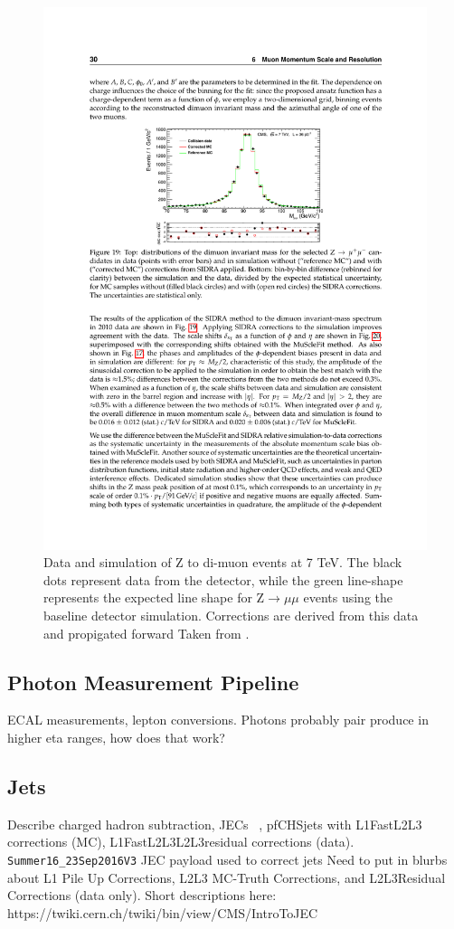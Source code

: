     \begin{figure}[h!]
      \centering
      \includegraphics[width=.7\textwidth]{figures/muon_Z_resolution.pdf}
      \caption{Data and simulation of Z to di-muon events at 7 TeV. The black dots represent data from the detector, while the green line-shape represents the expected line shape for Z$\to\mu\mu$ events using the baseline detector simulation. Corrections are derived from this data and propigated forward Taken from \cite{cms_muons}.}
      \label{fig:muon_Z_resolution}
    \end{figure}
    
  \subsection{Photon Measurement Pipeline}
    ECAL measurements, lepton conversions. Photons probably pair produce in higher eta ranges, how does that work?
  \subsection{Jets} \label{sec:jets}
    Describe charged hadron subtraction, JECs ~\cite{JERC}, \cite{JEC_2016}
    pfCHSjets with L1FastL2L3 corrections (MC), L1FastL2L3L2L3residual corrections (data).
    \verb=Summer16_23Sep2016V3= JEC payload used to correct jets
    Need to put in blurbs about L1 Pile Up Corrections, L2L3 MC-Truth Corrections, and L2L3Residual Corrections (data only). Short descriptions here: https://twiki.cern.ch/twiki/bin/view/CMS/IntroToJEC 

